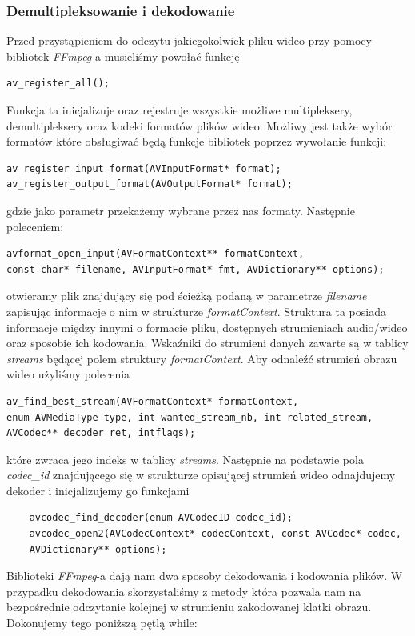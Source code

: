 \documentclass[twoside]{projektInzynierskiMS}
\begin{document}
\subsubsection{Demultipleksowanie i dekodowanie}
Przed przystąpieniem do odczytu jakiegokolwiek pliku wideo przy pomocy bibliotek \emph{FFmpeg}-a musieliśmy powołać funkcję 
\begin{verbatim}
av_register_all();
\end{verbatim}
Funkcja ta inicjalizuje oraz rejestruje wszystkie możliwe multipleksery, demultipleksery oraz kodeki formatów plików wideo. Możliwy jest także wybór formatów które obsługiwać będą funkcje bibliotek poprzez wywołanie funkcji:
\begin{verbatim}
av_register_input_format(AVInputFormat* format);
av_register_output_format(AVOutputFormat* format);
\end{verbatim}
gdzie jako parametr przekażemy wybrane przez nas formaty. Następnie poleceniem: 
\begin{verbatim}
avformat_open_input(AVFormatContext** formatContext, 
const char* filename, AVInputFormat* fmt, AVDictionary** options);	
\end{verbatim}
otwieramy plik znajdujący się pod ścieżką podaną w parametrze \emph{filename} zapisując informacje o nim w strukturze \emph{formatContext}. Struktura ta posiada informacje między innymi o formacie pliku, dostępnych strumieniach audio/wideo oraz sposobie ich kodowania. Wskaźniki do strumieni danych zawarte są w tablicy \emph{streams} będącej polem struktury \emph{formatContext}. Aby odnaleźć strumień obrazu wideo użyliśmy polecenia
\begin{verbatim}
av_find_best_stream(AVFormatContext* formatContext, 
enum AVMediaType type, int wanted_stream_nb, int related_stream, 
AVCodec** decoder_ret, intflags);
\end{verbatim}
które zwraca jego indeks w tablicy \emph{streams}. Następnie na podstawie pola \emph{codec\_id} znajdującego się w strukturze opisującej strumień wideo odnajdujemy dekoder i inicjalizujemy go funkcjami 
\begin{verbatim}
	avcodec_find_decoder(enum AVCodecID codec_id);
	avcodec_open2(AVCodecContext* codecContext, const AVCodec* codec, 
	AVDictionary** options);
\end{verbatim}
Biblioteki \emph{FFmpeg}-a dają nam dwa sposoby dekodowania i kodowania plików. W przypadku dekodowania skorzystaliśmy z metody która pozwala nam na bezpośrednie odczytanie kolejnej w strumieniu zakodowanej klatki obrazu. Dokonujemy tego poniższą pętlą while: 
\end{document}
